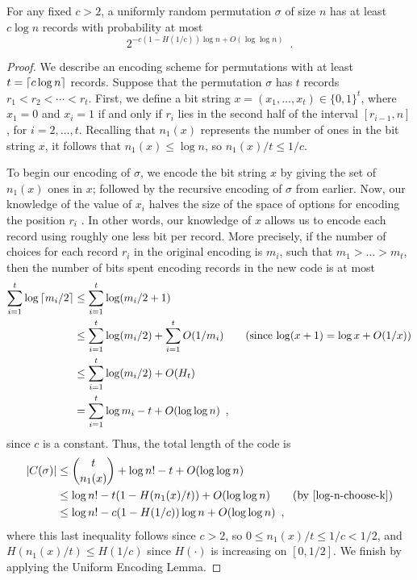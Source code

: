 \documentclass[prodmode,acmcsur]{acmsmall}
\begin{document}
\begin{thm}
  For any fixed $c > 2$, 
  a uniformly random permutation $\sigma$ of size $n$ has at least $c
  \log n$ records with probability at most
  \[
    2^{-c (1 - H(1/c)) \log n + O(\log \log n)}\enspace .
  \]
\end{thm}
\begin{proof}
We describe an encoding scheme for permutations with at least 
$t = {\lceil c \log n \rceil}$ records. 
Suppose that the permutation $\sigma$ has $t$ records
$r_1 < r_2 < \cdots < r_t$. First, we define a
bit string $x = (x_1, \dots, x_t) \in \{0, 1\}^t$, where $x_1 = 0$
and $x_i = 1$ if and only if $r_i$ lies in the second half of the
interval $[r_{i - 1}, n]$, for $i = 2, \dots, t$. 
Recalling that  $n_1(x)$ represents the 
number of ones in the bit string $x$, it follows that 
$n_1(x) \leq \log n$, so $n_1(x)/t \leq 1/c$.

To begin our encoding of $\sigma$, we encode the bit string $x$ by
giving the set of $n_1(x)$ ones in $x$; followed by the 
recursive encoding of $\sigma$ from earlier. Now, our knowledge of
the value of $x_i$ halves the size of the space of options for
encoding the position $r_i$ . In other words, our knowledge of $x$
allows us to encode each record using roughly one less bit per
record. More precisely, if the number of choices for each record
$r_i$ in the original encoding is $m_i$, such that $m_1 > \dots >
  m_t$, then the number of bits spent encoding records in the new code
  is at most
  \begin{align*}
    \sum_{i = 1}^t \log {\lceil m_i/2 \rceil} &\leq \sum_{i = 1}^t \log (m_i/2
                                       + 1)
    \\
                                     &\leq \sum_{i = 1}^t \log (m_i/2) + \sum_{i = 1}^t O(1/m_i) \tag{since $\log (x + 1) = \log x + O(1/x)$} \\
                                     &\leq \sum_{i = 1}^t \log (m_i/2) + O(H_t) \\
                                     &= \sum_{i = 1}^t \log
                                       m_i - t + O(\log \log n) \enspace ,
  \end{align*}
  since $c$ is a constant. Thus, the total length of the code is
  \begin{align*}
    |C(\sigma)| &\leq \binom{t}{n_1(x)} + \log n! - t + O(\log \log n) \\
                &\leq \log n! - t (1 - H(n_1(x)/t)) + O(\log \log n) \tag{by \eqref{log-n-choose-k}}\\
                &\leq \log n! - c (1 - H(1/c))\log n + O(\log \log n) \enspace ,
  \end{align*}
  where this last inequality follows since $c > 2$, so 
  $0 \leq n_1(x)/t \leq 1/c < 1/2$, and $H(n_1(x)/t)
  \leq H(1/c)$ since $H(\cdot)$ is increasing on $[0, 1/2]$. 
  We finish by applying the Uniform Encoding Lemma.
\end{proof}
\end{document}
